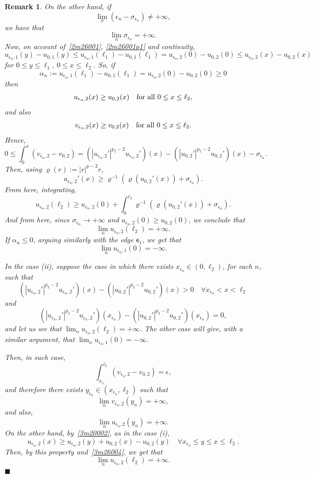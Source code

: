 \documentclass[reqno,12pt]{amsart}
\newtheorem{remark}[theorem]{Remark}
\def\e{\mathsf{e}} 	%
\numberwithin{equation}{section} %
\begin{document}
\begin{remark}
On the other hand, if 
$$\lim_n(\epsilon_n-\sigma_{\epsilon_n})\not=+\infty,$$
we have that $$\lim_n\sigma_{\epsilon_n}=+\infty.$$ 
Now, on account of~\eqref{2m26001}, \eqref{2m26001p1}  and continuity,
$$u_{\epsilon_n,1}(y)-u_{0,1}(y)\le u_{\epsilon_n,1}(\ell_1)-u_{0,1}(\ell_1)=u_{\epsilon_n,2}(0)-u_{0,2}(0)\le u_{\epsilon_n,2}(x)-u_{0,2}(x)$$  for $0\le y\le\ell_1,\ 0\le x\le \ell_2$.
So, if $$\alpha_n:=u_{\epsilon_n,1}(\ell_1)-u_{0,1}(\ell_1)=u_{\epsilon_n,2}(0)-u_{0,2}(0)\ge 0$$ then
$$u_{\epsilon_n,2}(x)\ge u_{0,2}(x)\quad\hbox{for all } 0\le x\le \ell_2,$$ and also
$$v_{\epsilon_n,2}(x)\ge v_{0,2}(x)\quad\hbox{for all } 0\le x\le \ell_2.$$
Hence,
$$0\le \int_{0}^{x}(v_{\epsilon_n,2}-v_{0,2})=(|u_{\epsilon_n,2}'|^{p_{2}-2}u_{\epsilon_n,2}')(x)-
(|u_{0,2}'|^{p_{2}-2}u_{0,2}')(x)
 -\sigma_{\epsilon_n}.$$
Then, using $\varrho(r):= \vert r \vert^{p-2}r$,
 $$u_{\epsilon_n,2}'(x)\ge\varrho^{-1}\left(\varrho(u_{0,2}'(x))+\sigma_{\epsilon_n}\right).$$
From here, integrating,
$$u_{\epsilon_n,2}(\ell_2)\ge u_{\epsilon_n,2}(0)+\int_{0}^{\ell_2}\varrho^{-1}\left(\varrho(u_{0,2}'(x))+\sigma_{\epsilon_n}\right).$$
 And from here, since $\sigma_{\epsilon_n}\to +\infty$ and $u_{\epsilon_n,2}(0)\ge u_{0,2}(0)$, we conclude that 
 $$\lim_n u_{\epsilon_n,2}(\ell_2)=+\infty.$$
 If $\alpha_n\le0$, arguing similarly with the edge $\e_1$, we get that
 $$\lim_n u_{\epsilon_n,1}(0)=-\infty.$$


In the case (ii),   suppose the case in which  there exists $x_{\epsilon_n}\in (0,\ell_2)$, for each $n$, such that
\begin{equation}\label{3m20002}(|u_{\epsilon_n,2}'|^{p_{2}-2}u_{\epsilon_n,2}')(x)
 -(|u_{0,2}'|^{p_{2}-2}u_{0,2}')(x)>0\quad\forall x_{\epsilon_n}<x<\ell_2
 \end{equation}
 and
$$(|u_{\epsilon_n,2}'|^{p_{2}-2}u_{\epsilon_n,2}')(x_{\epsilon_n})
 -(|u_{0,2}'|^{p_{2}-2}u_{0,2}')(x_{\epsilon_n})=0,$$ and let us see that  $\lim_n u_{\epsilon_n,2}(\ell_2)=+\infty$. The other case will give, with a similar argument, that $\lim_n u_{\epsilon_n,1}(0)=-\infty$.
 
 Then, in such case,
 $$\int_{x_{\epsilon_n}}^{\ell_2}(v_{\epsilon_n,2}-v_{0,2})=\epsilon,$$
 and therefore there exists $y_{\epsilon_n}\in (x_{\epsilon_n},\ell_2)$ such that 
 $$\lim_n v_{\epsilon_n,2}(y_n)=+\infty,$$
and also,
\begin{equation}\label{3m26004}\lim_n u_{\epsilon_n,2}(y_n)=+\infty.
\end{equation}
On the other hand, by~\eqref{3m20002}, as in the case (i),
\begin{equation}\label{3m26003}
u_{\epsilon_n,2}(x)\ge u_{\epsilon_n,2}(y)+u_{0,2}(x)-u_{0,2}(y)\quad\forall x_{\epsilon_n}\le y\le x\le\ell_2.
\end{equation}
Then, by this property and~\eqref{3m26004}, we get that
$$\lim_n u_{\epsilon_n,2}(\ell_2)=+\infty.$$ 
\hfill  $\blacksquare$
\end{remark}
\end{document}

